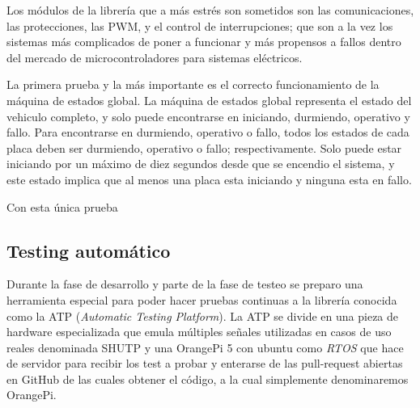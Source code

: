 \documentclass{report}
\begin{document}
\par \vspace{0.3cm}
Los módulos de la librería que a más estrés son sometidos son las comunicaciones, las protecciones, las PWM, y el control de interrupciones; que son a la vez los sistemas más complicados de poner a funcionar y más propensos a fallos dentro del mercado de microcontroladores para sistemas eléctricos.
\par 
La primera prueba y la más importante es el correcto funcionamiento de la máquina de estados global. La máquina de estados global representa el estado del vehiculo completo, y solo puede encontrarse en iniciando, durmiendo, operativo y fallo. Para encontrarse en durmiendo, operativo o fallo, todos los estados de cada placa deben ser durmiendo, operativo o fallo; respectivamente. Solo puede estar iniciando por un máximo de diez segundos desde que se encendio el sistema, y este estado implica que al menos una placa esta iniciando y ninguna esta en fallo. 
\par \vspace{0.3cm}
Con esta única prueba 

\subsection{Testing automático}
Durante la fase de desarrollo y parte de la fase de testeo se preparo una herramienta especial para poder hacer pruebas continuas a la librería conocida como la ATP (\textit{Automatic Testing Platform}). La ATP se divide en una pieza de hardware especializada que emula múltiples señales utilizadas en casos de uso reales denominada SHUTP y una OrangePi 5 con ubuntu como \textit{RTOS} que hace de servidor para recibir los test a probar y enterarse de las pull-request abiertas en GitHub de las cuales obtener el código, a la cual simplemente denominaremos OrangePi. \par \vspace{0.3cm}
\end{document}
